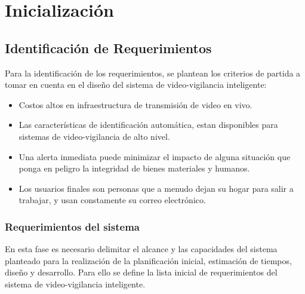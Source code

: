 \chapter{Inicialización}


\section{Identificación de Requerimientos}
Para la identificación de los requerimientos, se plantean los criterios de partida a tomar en cuenta en el diseño del sistema de video-vigilancia inteligente:
\begin{itemize}
    \item Costos altos en infraestructura de transmisión de video en vivo.
    \item Las características de identificación automática, estan disponibles para sistemas de video-vigilancia de alto nivel.
    \item Una alerta inmediata puede minimizar el impacto de alguna situación que ponga en peligro la integridad de bienes materiales y humanos.
    \item Los usuarios finales son personas que a menudo dejan su hogar para salir a trabajar, y usan constamente su correo electrónico.
\end{itemize}

\subsection{Requerimientos del sistema}
En esta fase es necesario delimitar el alcance y las capacidades del sistema planteado para la realización de la planificación inicial, estimación de tiempos, diseño y desarrollo. Para ello se define la lista inicial de requerimientos del sistema de video-vigilancia inteligente.\\

